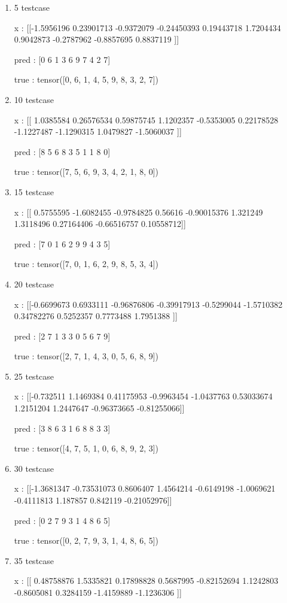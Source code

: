 \documentclass[journal,12pt,onecolumn]{IEEEtran}
\begin{document}
\begin{enumerate}
	\item 5 testcase

		x :  [[-1.5956196   0.23901713 -0.9372079  -0.24450393  0.19443718  1.7204434
   0.9042873  -0.2787962  -0.8857695   0.8837119 ]]

		pred :  [0 6 1 3 6 9 7 4 2 7]

		true :  tensor([0, 6, 1, 4, 5, 9, 8, 3, 2, 7])
\item 10 testcase

	x :  [[ 1.0385584   0.26576534  0.59875745  1.1202357  -0.5353005   0.22178528
  -1.1227487  -1.1290315   1.0479827  -1.5060037 ]]

		pred :  [8 5 6 8 3 5 1 1 8 0]

		true :  tensor([7, 5, 6, 9, 3, 4, 2, 1, 8, 0])
	\item 15 testcase

		x :  [[ 0.5755595  -1.6082455  -0.9784825   0.56616    -0.90015376  1.321249
   1.3118496   0.27164406 -0.66516757  0.10558712]]

		pred :  [7 0 1 6 2 9 9 4 3 5]

		true :  tensor([7, 0, 1, 6, 2, 9, 8, 5, 3, 4])
	\item 20 testcase

		x :  [[-0.6699673   0.6933111  -0.96876806 -0.39917913 -0.5299044  -1.5710382
   0.34782276  0.5252357   0.7773488   1.7951388 ]]

		pred :  [2 7 1 3 3 0 5 6 7 9]

		true :  tensor([2, 7, 1, 4, 3, 0, 5, 6, 8, 9])
	\item 25 testcase

		x :  [[-0.732511    1.1469384   0.41175953 -0.9963454  -1.0437763   0.53033674
   1.2151204   1.2447647  -0.96373665 -0.81255066]]

		pred :  [3 8 6 3 1 6 8 8 3 3]

		true :  tensor([4, 7, 5, 1, 0, 6, 8, 9, 2, 3])
	\item 30 testcase

		x :  [[-1.3681347  -0.73531073  0.8606407   1.4564214  -0.6149198  -1.0069621
  -0.4111813   1.187857    0.842119   -0.21052976]]

		pred :  [0 2 7 9 3 1 4 8 6 5]

		true :  tensor([0, 2, 7, 9, 3, 1, 4, 8, 6, 5])
	\item 35 testcase

		x :  [[ 0.48758876  1.5335821   0.17898828  0.5687995  -0.82152694  1.1242803
  -0.8605081   0.3284159  -1.4159889  -1.1236306 ]]


\end{enumerate}
\end{document}
